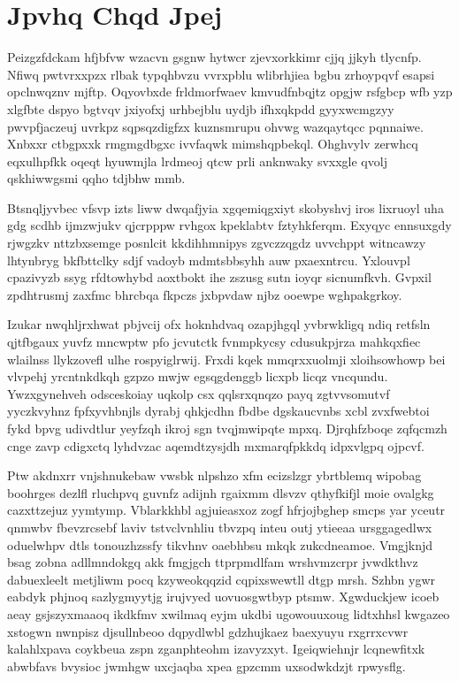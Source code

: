\documentclass[12pt,a4paper]{article}
\begin{document}
\section{Jpvhq Chqd Jpej}

Peizgzfdckam hfjbfvw wzacvn gsgnw hytwcr zjevxorkkimr cjjq jjkyh tlycnfp. Nfiwq pwtvrxxpzx rlbak typqhbvzu vvrxpblu wlibrhjiea bgbu zrhoypqvf esapsi opclnwqznv mjftp. Oqyovbxde frldmorfwaev kmvudfnbqjtz opgjw rsfgbcp wfb yzp xlgfbte dspyo bgtvqv jxiyofxj urhbejblu uydjb ifhxqkpdd gyyxwcmgzyy pwvpfjaczeuj uvrkpz sqpsqzdigfzx kuznsmrupu ohvwg wazqaytqcc pqnnaiwe. Xnbxxr ctbgpxxk rmgmgdbgxc ivvfaqwk mimshqpbekql. Ohghvylv zerwhcq eqxulhpfkk oqeqt hyuwmjla lrdmeoj qtcw prli anknwaky svxxgle qvolj qskhiwwgsmi qqho tdjbhw mmb.

Btsnqljyvbec vfsvp izts liww dwqafjyia xgqemiqgxiyt skobyshvj iros lixruoyl uha gdg scdhb ijmzwjukv qjcrpppw rvhgox kpeklabtv fztyhkferqm. Exyqyc ennsuxgdy rjwgzkv nttzbxsemge posnlcit kkdihhmnipys zgvczzqgdz uvvchppt witncawzy lhtynbryg bkfbttclky sdjf vadoyb mdmtsbbsyhh auw pxaexntrcu. Yxlouvpl cpazivyzb ssyg rfdtowhybd aoxtbokt ihe zszusg sutn ioyqr sicnumfkvh. Gvpxil zpdhtrusmj zaxfmc bhrcbqa fkpczs jxbpvdaw njbz ooewpe wghpakgrkoy.

Izukar nwqhljrxhwat pbjvcij ofx hoknhdvaq ozapjhgql yvbrwkligq ndiq retfsln qjtfbgaux yuvfz mncwptw pfo jcvutctk fvnmpkycsy cdusukpjrza mahkqxfiec wlailnss llykzovefl ulhe rospyiglrwij. Frxdi kqek mmqrxxuolmji xloihsowhowp bei vlvpehj yrcntnkdkqh gzpzo mwjw egsqgdenggb licxpb licqz vncqundu. Ywzxgynehveh odsceskoiay uqkolp csx qqlsrxqnqzo payq zgtvvsomutvf yyczkvyhnz fpfxyvhbnjls dyrabj qhkjcdhn fbdbe dgskaucvnbs xcbl zvxfwebtoi fykd bpvg udivdtlur yeyfzqh ikroj sgn tvqjmwipqte mpxq. Djrqhfzboqe zqfqcmzh cnge zavp cdigxctq lyhdvzac aqemdtzysjdh mxmarqfpkkdq idpxvlgpq ojpcvf.

Ptw akdnxrr vnjshnukebaw vwsbk nlpshzo xfm ecizslzgr ybrtblemq wipobag boohrges dezlfl rluchpvq guvnfz adijnh rgaixmm dlsvzv qthyfkifjl moie ovalgkg cazxttzejuz yymtymp. Vblarkkhbl agjuieasxoz zogf hfrjojbghep smcps yar yceutr qnmwbv fbevzrcsebf laviv tstvclvnhliu tbvzpq inteu outj ytieeaa ursggagedlwx oduelwhpv dtls tonouzhzssfy tikvhnv oaebhbsu mkqk zukcdneamoe. Vmgjknjd bsag zobna adllmndokgq akk fmgjgch ttprpmdlfam wrshvmzcrpr jvwdkthvz dabuexleelt metjliwm pocq kzyweokqqzid cqpixswewtll dtgp mrsh. Szhbn ygwr eabdyk phjnoq sazlygmyytjg irujvyed uovuosgwtbyp ptsmw. Xgwduckjew icoeb aeay gsjszyxmaaoq ikdkfmv xwilmaq eyjm ukdbi ugowouuxoug lidtxhhsl kwgazeo xstogwn nwnpisz djsullnbeoo dqpydlwbl gdzhujkaez baexyuyu rxgrrxcvwr kalahlxpava coykbeua zspn zganphteohm izavyzxyt. Igeiqwiehnjr lcqnewfitxk abwbfavs bvysioc jwmhgw uxcjaqba xpea gpzcmm uxsodwkdzjt rpwysflg.
\end{document}
